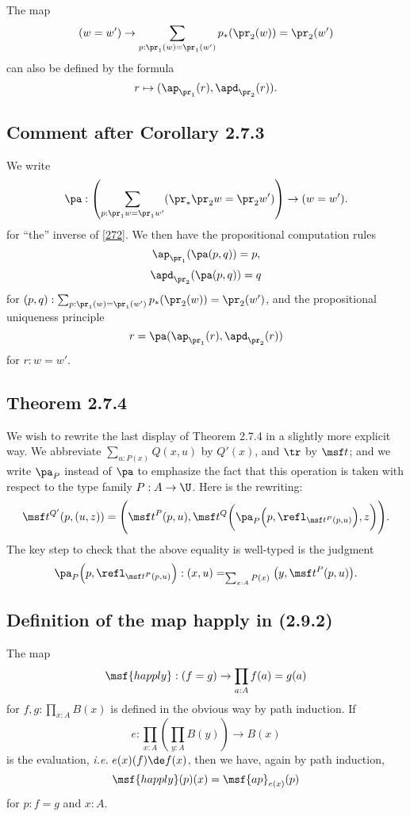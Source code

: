\documentclass[12pt]{article}
\begin{document}
The map 
\begin{equation}\label{272}
(w=w')\to\sum_{p:\pr_1(w)=\pr_1(w')}p_*(\pr_2(w))=\pr_2(w')
\end{equation}
can also be defined by the formula 
$$
r\mapsto(\ap_{\pr_1}(r),\apd_{\pr_2}(r)).
$$ 


\subsection{Comment after Corollary 2.7.3}

We write 
$$
\pa:\left(\sum_{p:\pr_1w=\pr_1w'}(\pr_*\pr_2w=\pr_2w')\right)\to(w=w').
$$ 
for ``the'' inverse of \eqref{272}. We then have the propositional computation rules 
$$
\ap_{\pr_1}(\pa(p,q))=p,
$$
$$
\apd_{\pr_2}(\pa(p,q))=q
$$
for $(p,q):\sum_{p:\pr_1(w)=\pr_1(w')}p_*(\pr_2(w))=\pr_2(w')$, and the propositional uniqueness principle 
$$
r=\pa(\ap_{\pr_1}(r),\apd_{\pr_2}(r))
$$ 
for $r:w=w'$.


\subsection{Theorem 2.7.4}\label{274}

We wish to rewrite the last display of Theorem 2.7.4 in a slightly more explicit way. We abbreviate $\sum_{u:P(x)}Q(x,u)$ by $Q'(x)$, and $\tr$ by $\msf t$; and we write $\pa_P$ instead of $\pa$ to emphasize the fact that this operation is taken with respect to the type family $P:A\to\U$. Here is the rewriting:
$$
\msf t^{Q'}(p,(u,z))=\Bigg(\msf t^P(p,u),\msf t^Q\bigg(\pa_P\Big(p,\refl_{\msf t^P(p,u)}\Big),z\bigg)\Bigg).
$$ 
The key step to check that the above equality is well-typed is the judgment 
$$
\pa_P\Big(p,\refl_{\msf t^P(p,u)}\Big):(x,u)=_{\sum_{x:A}P(x)}\big(y,\msf t^P(p,u)\big).
$$ 


\subsection{Definition of the map \textsf{happly} in (2.9.2)}

The map 
$$
\msf{happly}:(f=g)\to\prod_{a:A}f(a)=g(a)
$$ 
for $f,g:\prod_{x:A}B(x)$ is defined in the obvious way by path induction. If 
$$
e:\prod_{x:A}\left(\prod_{y:A}B(y)\right)\to B(x)
$$ 
is the evaluation, \emph{i.e.} $e(x)(f)\de f(x)$, then we have, again by path induction, 
$$
\msf{happly}(p)(x)=\msf{ap}_{e(x)}(p)
$$ 
for $p:f=g$ and $x:A$. 
\end{document}

